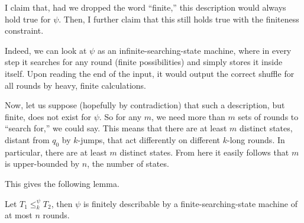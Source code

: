 I claim that, had we dropped the word ``finite,'' this description would always hold true for $\psi$. Then, I further claim that this still holds true with the finiteness constraint.

Indeed, we can look at $\psi$ as an infinite-searching-state machine, where in every step it searches for any round (finite possibilities) and simply stores it inside itself. Upon reading the end of the input, it would output the correct shuffle for all rounds by heavy, finite calculations.

Now, let us suppose (hopefully by contradiction) that such a description, but finite, does not exist for $\psi$. So for any $m$, we need more than $m$ sets of rounds to ``search for,'' we could say. This means that there are at least $m$ distinct states, distant from $q_0$ by $k$-jumps, that act differently on different $k$-long rounds. In particular, there are at least $m$ distinct states. From here it easily follows that $m$ is upper-bounded by $n$, the number of states.

This gives the following lemma.

\begin{lemma}
Let $T_1\leq_k^\psi T_2$, then $\psi$ is finitely describable by a finite-searching-state machine of at most $n$ rounds.
\end{lemma}

\pagebreak

